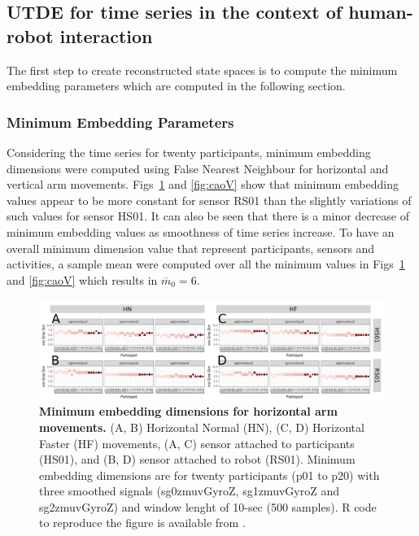 \subsection{UTDE for time series in the context of human-robot interaction}
The first step to create reconstructed state spaces is to compute 
the minimum embedding parameters which are computed in the following section.

\subsubsection{Minimum Embedding Parameters}


Considering the time series for twenty participants,
minimum embedding dimensions were computed using False Nearest Neighbour
for horizontal and vertical arm movements. %
Figs~\ref{fig:caoH} and \ref{fig:caoV} show that minimum embedding values appear 
to be more constant for sensor RS01 than the slightly variations of such values 
for sensor HS01.
It can also be seen that there is a minor decrease of minimum embedding values
as smoothness of time series increase. 
To have an overall minimum dimension value that represent participants,
sensors and activities, a sample mean were computed over all the minimum values 
in Figs~\ref{fig:caoH} and \ref{fig:caoV} which results in $\overline{m}_0=6$.
\begin{figure}[!h]
\centering
\includegraphics[width=1.0\textwidth]{cao_aHw10}
	\caption{
	{\bf Minimum embedding dimensions for horizontal arm movements.} 
		(A, B) Horizontal Normal (HN), (C, D) Horizontal Faster (HF) movements,
		(A, C) sensor attached to participants (HS01), and
		(B, D) sensor attached to robot (RS01).
		Minimum embedding dimensions are for twenty participants (p01 to p20) with
		three smoothed signals (sg0zmuvGyroZ, sg1zmuvGyroZ and sg2zmuvGyroZ)
		and window lenght of 10-sec (500 samples).
		R code to reproduce the figure is available from \cite{hwum2018}.
        }
    \label{fig:caoH}
\end{figure}

